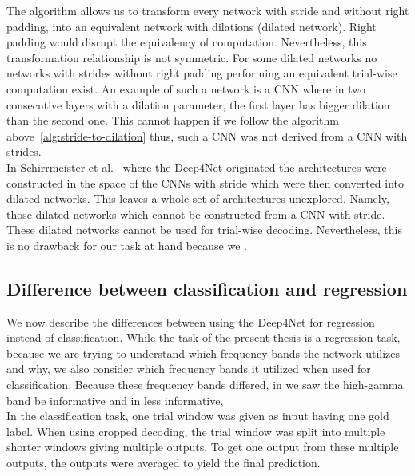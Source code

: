 The algorithm allows us to transform every network with stride and without right padding, into an equivalent network with dilations (dilated network).
Right padding would disrupt the equivalency of computation.
Nevertheless, this transformation relationship is not symmetric.
For some dilated networks no networks with strides without right padding performing an equivalent trial-wise computation exist.
An example of such a network is a CNN where in two consecutive layers with a dilation parameter, the first layer has bigger dilation than the second one.
This cannot happen if we follow the algorithm above~\ref{alg:stride-to-dilation} thus, such a CNN was not derived from a CNN with strides. \\

In Schirrmeister et al.~\cite{schirrmeister-deep-2017} where the Deep4Net originated the architectures were constructed in the space of the CNNs with stride which were then converted into dilated networks.
This leaves a whole set of architectures unexplored.
Namely, those dilated networks which cannot be constructed from a CNN with stride.
These dilated networks cannot be used for trial-wise decoding.
Nevertheless, this is no drawback for our task at hand because we .

\subsection{Difference between classification and regression}\label{subsec:difference-between-deep4net-for-classification-and-regression}
We now describe the differences between using the Deep4Net for regression instead of classification.
While the task of the present thesis is a regression task, because we are trying to understand which frequency bands the network utilizes and why, we also consider which frequency bands it utilized when used for classification. 
Because these frequency bands differed, in \cite{schirrmeister-deep-2017, hartmann-hierarchical-2018} we saw the high-gamma band be informative and in \cite{Hammer-2021} less informative, \\
In the classification task, one trial window was given as input having one gold label.
When using cropped decoding, the trial window was split into multiple shorter windows giving multiple outputs.
To get one output from these multiple outputs, the outputs were averaged to yield the final prediction. \\

